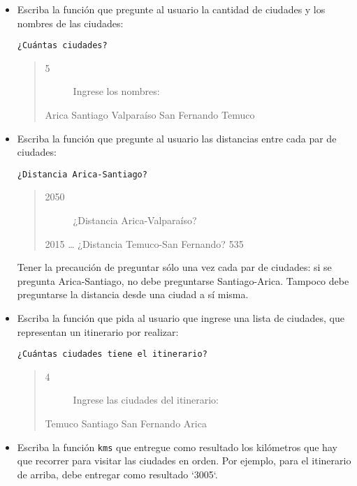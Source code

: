 \begin{itemize}
\item
  Escriba la función que pregunte al usuario la cantidad de ciudades y
  los nombres de las ciudades:

\begin{lstlisting}
¿Cuántas ciudades?
\end{lstlisting}

  \begin{quote}
  \begin{description}
  \item[5]
  Ingrese los nombres:
  \end{description}

  Arica Santiago Valparaíso San Fernando Temuco
  \end{quote}
\item
  Escriba la función que pregunte al usuario las distancias entre cada
  par de ciudades:

\begin{lstlisting}
¿Distancia Arica-Santiago?
\end{lstlisting}

  \begin{quote}
  \begin{description}
  \item[2050]
  ¿Distancia Arica-Valparaíso?
  \end{description}

  2015 \ldots{} ¿Distancia Temuco-San Fernando? 535
  \end{quote}

  Tener la precaución de preguntar sólo una vez cada par de ciudades: si
  se pregunta Arica-Santiago, no debe preguntarse Santiago-Arica.
  Tampoco debe preguntarse la distancia desde una ciudad a sí misma.
\item
  Escriba la función que pida al usuario que ingrese una lista de
  ciudades, que representan un itinerario por realizar:

\begin{lstlisting}
¿Cuántas ciudades tiene el itinerario?
\end{lstlisting}

  \begin{quote}
  \begin{description}
  \item[4]
  Ingrese las ciudades del itinerario:
  \end{description}

  Temuco Santiago San Fernando Arica
  \end{quote}
\item
  Escriba la función \lstinline!kms! que entregue como resultado los
  kilómetros que hay que recorrer para visitar las ciudades en orden.
  Por ejemplo, para el itinerario de arriba, debe entregar como
  resultado `3005`.
\end{itemize}

